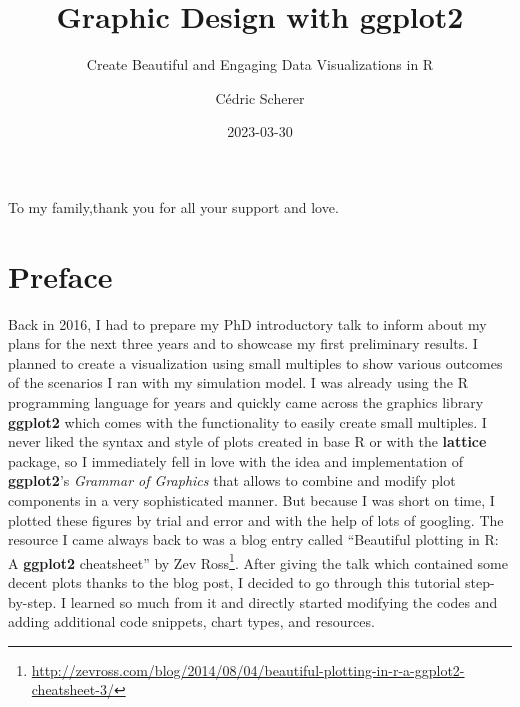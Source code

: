 \documentclass[
]{krantz}
\title{Graphic Design with ggplot2}
\subtitle{Create Beautiful and Engaging Data Visualizations in R}
\author{Cédric Scherer}
\date{2023-03-30}
\renewcommand{\href}[2]{#2\footnote{\url{#1}}}
\begin{document}
\maketitle


\thispagestyle{empty}

\begin{center}
To my family,thank you for all your support and love.
\end{center}

\setlength{\abovedisplayskip}{-5pt}
\setlength{\abovedisplayshortskip}{-5pt}

{
\hypersetup{linkcolor=}
\setcounter{tocdepth}{2}
\tableofcontents
}
\listoffigures
\listoftables
\hypertarget{preface}{%
\chapter*{Preface}\label{preface}}


Back in 2016, I had to prepare my PhD introductory talk to inform about my plans for the next three years and to showcase my first preliminary results. I planned to create a visualization using small multiples to show various outcomes of the scenarios I ran with my simulation model. I was already using the R programming language for years and quickly came across the graphics library \textbf{ggplot2} which comes with the functionality to easily create small multiples. I never liked the syntax and style of plots created in base R or with the \textbf{lattice} package, so I immediately fell in love with the idea and implementation of \textbf{ggplot2}'s \emph{Grammar of Graphics} that allows to combine and modify plot components in a very sophisticated manner. But because I was short on time, I plotted these figures by trial and error and with the help of lots of googling. The resource I came always back to was a blog entry called \href{http://zevross.com/blog/2014/08/04/beautiful-plotting-in-r-a-ggplot2-cheatsheet-3/}{``Beautiful plotting in R: A \textbf{ggplot2} cheatsheet'' by Zev Ross}. After giving the talk which contained some decent plots thanks to the blog post, I decided to go through this tutorial step-by-step. I learned so much from it and directly started modifying the codes and adding additional code snippets, chart types, and resources.
\end{document}

